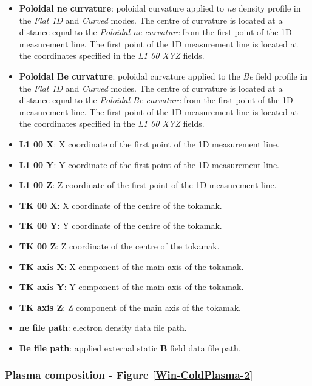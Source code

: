 \begin{itemize}
\begin{itemize}
    \end{itemize}
    \vspace{0.75em}
	\item \textbf{Poloidal ne curvature}: poloidal curvature applied to \textit{ne} density profile in the \textit{Flat 1D} and \textit{Curved} modes. The centre of curvature is located at a distance equal to the \textit{Poloidal ne curvature} from the first point of the 1D measurement line. The first point of the 1D measurement line is located at the coordinates specified in the \textit{L1 00 XYZ} fields.
	\vspace{1em}
	\item \textbf{Poloidal Be curvature}: poloidal curvature applied to the \textit{Be} field profile in the \textit{Flat 1D} and \textit{Curved} modes. The centre of curvature is located at a distance equal to the \textit{Poloidal Be curvature} from the first point of the 1D measurement line. The first point of the 1D measurement line is located at the coordinates specified in the \textit{L1 00 XYZ} fields.	
	\newpage
	\item \textbf{L1 00 X}: X coordinate of the first point of the 1D measurement line.
	\item \textbf{L1 00 Y}: Y coordinate of the first point of the 1D measurement line.
	\item \textbf{L1 00 Z}: Z coordinate of the first point of the 1D measurement line.
	\\
	\item \textbf{TK 00 X}: X coordinate of the centre of the tokamak.
	\item \textbf{TK 00 Y}: Y coordinate of the centre of the tokamak.
	\item \textbf{TK 00 Z}: Z coordinate of the centre of the tokamak.
	\\
	\item \textbf{TK axis X}: X component of the main axis of the tokamak.
    \item \textbf{TK axis Y}: Y component of the main axis of the tokamak.
    \item \textbf{TK axis Z}: Z component of the main axis of the tokamak.
    \\
    \item \textbf{ne file path}: electron density data file path.
    \item \textbf{Be file path}: applied external static \textbf{B} field data file path.
\end{itemize}

\subsubsection{Plasma composition - Figure \ref{Win-ColdPlasma-2}}

